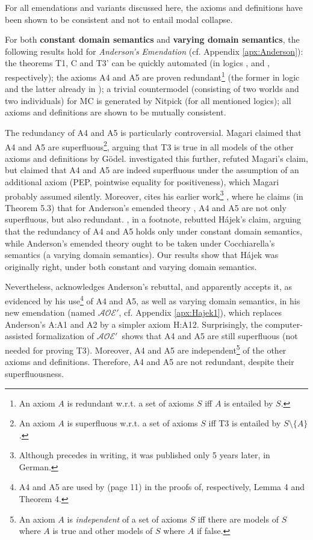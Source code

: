 \documentclass{birkjour}
\newcommand{\AOEH}{$\mathcal{AOE}'$}
\theoremstyle{definition}
\theoremstyle{remark}
\numberwithin{equation}{section}
\begin{document}
For all emendations and variants discussed here, the axioms and definitions have been shown to be consistent and 
not to entail modal collapse. 

For both \textbf{constant domain semantics} and \textbf{varying domain semantics}, the following results hold for \emph{Anderson's Emendation} (cf. Appendix \ref{apx:Anderson}): 
%
the theorems T1, C and T3' can be quickly automated (in logics \K, \K and \KB, respectively);
%
the axioms A4 and A5 are proven redundant\footnote{
  An axiom $A$ is redundant w.r.t. a set of axioms $S$ iff $A$ is entailed by $S$. 
} (the former in
logic \KFourB and the latter already in \K);
%
a trivial countermodel (consisting of two worlds and 
two individuals) for MC is generated by Nitpick (for all mentioned logics); all axioms and definitions are shown to be mutually consistent. 

The redundancy of A4 and A5 is particularly controversial. Magari \cite{Magari1988} claimed that A4 and A5 are superfluous\footnote{
  An axiom $A$ is superfluous w.r.t. a set of axioms $S$ iff T3 is entailed by $S \setminus \{ A \}$.
}, arguing that T3 is true in all models of the other axioms and definitions by Gödel. \citet[p.~5-6]{Hajek_Magari_and_others_1996} investigated this further, refuted Magari's claim, but claimed that A4 and A5 are indeed superfluous under the assumption of an additional axiom (PEP, pointwise equality for positiveness), which Magari probably assumed silently. Moreover, \citet[p.~2]{Hajek_Magari_and_others_1996} cites his earlier work\footnote{Although \citep{Hajek_der_Mathematiker_2001} precedes \citep{Hajek_Magari_and_others_1996} in writing, it was published only 5 years later, in German.} \citep{Hajek_der_Mathematiker_2001}, where he claims (in Theorem 5.3) that for Anderson's emended theory \citep{anderson90:_some_emend_of_goedel_ontol_proof}, A4 and A5 are not only superfluous, but also redundant. \citet[footnote 1 in p.~1]{AndersonGettings}, in a footnote, rebutted Hájek's claim, arguing that the redundancy of A4 and A5 holds only under constant domain semantics, while Anderson's emended theory ought to be taken under Cocchiarella's semantics \citep{Cocchiarella} (a varying domain semantics). Our results show that Hájek was originally right, under both constant and varying domain semantics.

Nevertheless, \citet[p.~7]{Hajek2002} acknowledges Anderson's rebuttal, and apparently accepts it, as evidenced by  his use\footnote{
  A4 and A5 are used by \citet[p.~11]{Hajek2002} (page 11) in the proofs of, respectively, Lemma 4 and Theorem 4.
} 
of A4 and A5, as well as varying domain semantics, in his new
emendation (named \AOEH \citep[sec.~4]{Hajek2002}, cf. Appendix
\ref{apx:Hajek1}), which replaces Anderson's A:A1 and A2 by a simpler
axiom H:A12. Surprisingly, the computer-assisted formalization of
\AOEH\ shows that A4 and A5 are still superfluous (not needed for proving T3). Moreover, A4 and A5 are independent\footnote{
  An axiom $A$ is \emph{independent} of a set of axioms $S$ iff there are models of $S$ where $A$ is true and other models of $S$ where $A$ if false. 
} of the other axioms and definitions. Therefore, A4 and A5 are not redundant, despite their superfluousness. 
\end{document}
